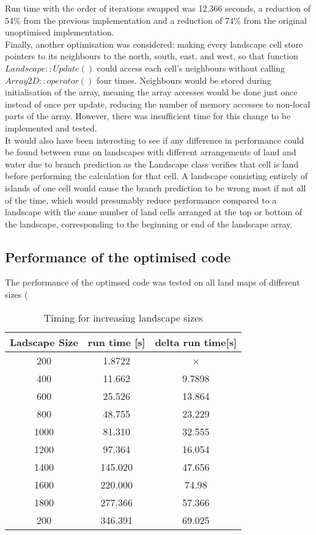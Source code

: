 Run time with the order of iterations swapped was 12.366 seconds, a reduction of 54\% from the previous implementation and a reduction of 74\% from the original unoptimised implementation.\\

Finally, another optimisation was considered: making every landscape cell store pointers to its neighbours to the north, south, east, and west, so that function $Landscape::Update()$ could access each cell's neighbours without calling $Array2D::operator()$ four times.
Neighbours would be stored during initialisation of the array, meaning the array accesses would be done just once instead of once per update, reducing the number of memory accesses to non-local parts of the array.
However, there was insufficient time for this change to be implemented and tested.\\

It would also have been interesting to see if any difference in performance could be found between runs on landscapes with different arrangements of land and water due to branch prediction as the Landscape class verifies that cell is land before performing the calculation for that cell.
A landscape consisting entirely of islands of one cell would cause the branch prediction to be wrong most if not all of the time, which would presumably reduce performance compared to a landscape with the same number of land cells arranged at the top or bottom of the landscape, corresponding to the beginning or end of the landscape array.




\subsection{Performance of the optimised code}
\label{performance of the optimied code}

The performance of the optimsed code was tested on all land maps of different sizes (

\begin{table}
\caption{Timing for increasing landscape sizes}
\label{tab: Size timing}
 \begin{center}
\begin{tabular}{|c|c|c|}
\hline
Ladscape Size & run time [s] & delta run time[s]\\
\hline
200 & 1.8722 & ×\\
\hline
400 & 11.662 & 9.7898\\
\hline
600 & 25.526 & 13.864\\
\hline
800 & 48.755 & 23.229\\
\hline
1000 & 81.310 & 32.555\\
\hline
1200 & 97.364 & 16.054\\
\hline
1400 & 145.020 & 47.656\\
\hline
1600 & 220.000 & 74.98\\
\hline
1800 & 277.366 & 57.366\\
\hline
200 & 346.391 & 69.025\\
\hline
\end{tabular}
\end{center}
\end{table}




